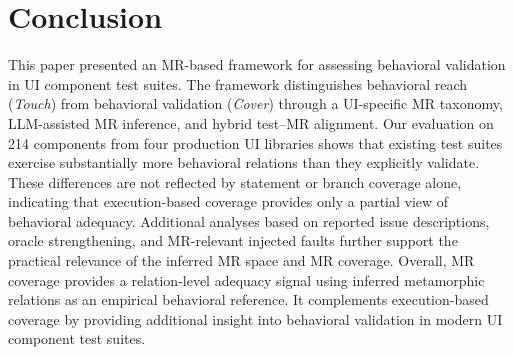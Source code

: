 \section{Conclusion}\label{sec:conclusion}

This paper presented an MR-based framework for assessing behavioral validation in UI component test suites. The framework distinguishes behavioral reach (\textit{Touch}) from behavioral validation (\textit{Cover}) through a UI-specific MR taxonomy, LLM-assisted MR inference, and hybrid test--MR alignment.
Our evaluation on 214 components from four production UI libraries shows that existing test suites exercise substantially more behavioral relations than they explicitly validate. These differences are not reflected by statement or branch coverage alone, indicating that execution-based coverage provides only a partial view of behavioral adequacy. Additional analyses based on reported issue descriptions, oracle strengthening, and MR-relevant injected faults further support the practical relevance of the inferred MR space and MR coverage.
Overall, MR coverage provides a relation-level adequacy signal using inferred metamorphic relations as an empirical behavioral reference. It complements execution-based coverage by providing additional insight into behavioral validation in modern UI component test suites.


